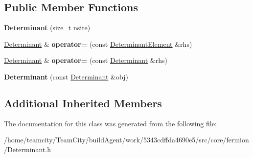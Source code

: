 \subsection*{Public Member Functions}
\begin{DoxyCompactItemize}
\item 
{\bfseries Determinant} (size\+\_\+t nsite)\hypertarget{classDeterminant_ab4bc213a4be8141ad78a5b89e55f6365}{}\label{classDeterminant_ab4bc213a4be8141ad78a5b89e55f6365}

\item 
\hyperlink{classDeterminant}{Determinant} \& {\bfseries operator=} (const \hyperlink{classDeterminantElement}{Determinant\+Element} \&rhs)\hypertarget{classDeterminant_a7e7423bd3b83b14a25039b70246f0bb7}{}\label{classDeterminant_a7e7423bd3b83b14a25039b70246f0bb7}

\item 
\hyperlink{classDeterminant}{Determinant} \& {\bfseries operator=} (const \hyperlink{classDeterminant}{Determinant} \&rhs)\hypertarget{classDeterminant_a4c2983ed67891b319c2fd9d7f518b698}{}\label{classDeterminant_a4c2983ed67891b319c2fd9d7f518b698}

\item 
{\bfseries Determinant} (const \hyperlink{classDeterminant}{Determinant} \&obj)\hypertarget{classDeterminant_a67cbe0742c6b5f3a211aff76112de960}{}\label{classDeterminant_a67cbe0742c6b5f3a211aff76112de960}

\end{DoxyCompactItemize}
\subsection*{Additional Inherited Members}


The documentation for this class was generated from the following file\+:\begin{DoxyCompactItemize}
\item 
/home/teamcity/\+Team\+City/build\+Agent/work/5343cdffda4690e5/src/core/fermion/Determinant.\+h\end{DoxyCompactItemize}
